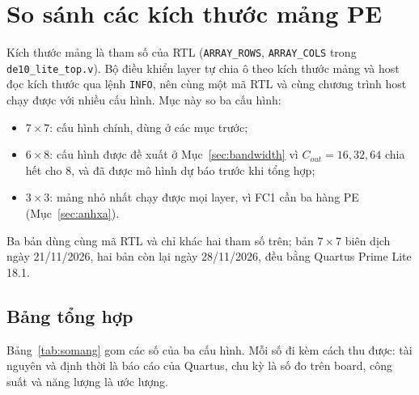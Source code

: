 \section{So sánh các kích thước mảng PE}\label{sec:somang}
Kích thước mảng là tham số của RTL (\texttt{ARRAY\_ROWS}, \texttt{ARRAY\_COLS} trong \texttt{de10\_lite\_top.v}).
Bộ điều khiển layer tự chia ô theo kích thước mảng và host đọc kích thước qua lệnh \texttt{INFO}, nên cùng một mã RTL và cùng chương trình host chạy được với nhiều cấu hình.
Mục này so ba cấu hình:
\begin{itemize}
  \item $7\times7$: cấu hình chính, dùng ở các mục trước;
  \item $6\times8$: cấu hình được đề xuất ở Mục~\ref{sec:bandwidth} vì $C_{out}=16,32,64$ chia hết cho $8$, và đã được mô hình dự báo trước khi tổng hợp;
  \item $3\times3$: mảng nhỏ nhất chạy được mọi layer, vì FC1 cần ba hàng PE (Mục~\ref{sec:anhxa}).
\end{itemize}
Ba bản dùng cùng mã RTL và chỉ khác hai tham số trên; bản $7\times7$ biên dịch ngày 21/11/2026, hai bản còn lại ngày 28/11/2026, đều bằng Quartus Prime Lite 18.1.

\subsection{Bảng tổng hợp}
Bảng~\ref{tab:somang} gom các số của ba cấu hình.
Mỗi số đi kèm cách thu được: tài nguyên và định thời là báo cáo của Quartus, chu kỳ là số đo trên board, công suất và năng lượng là ước lượng.

